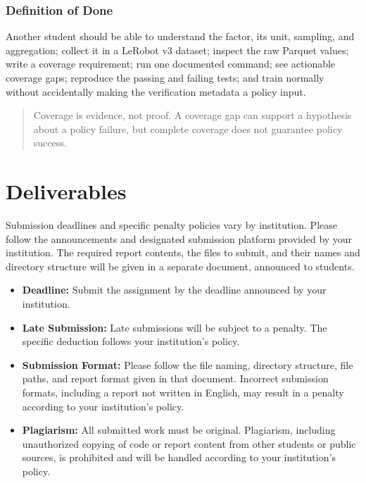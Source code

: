 \documentclass[11pt]{article}
\begin{document}
\subsubsection{Definition of Done}

Another student should be able to understand the factor, its unit, sampling, and aggregation; collect it in a
LeRobot v3 dataset; inspect the raw Parquet values; write a coverage requirement; run one documented command; see
actionable coverage gaps; reproduce the passing and failing tests; and train normally without accidentally making
the verification metadata a policy input.

\begin{quote}
Coverage is evidence, not proof. A coverage gap can support a hypothesis about a policy failure, but complete
coverage does not guarantee policy success.
\end{quote}


\section{Deliverables}

Submission deadlines and specific penalty policies vary by institution. Please follow the announcements and designated submission platform provided by your institution. The required report contents, the files to submit, and their names and directory structure will be given in a separate document, announced to students.

\begin{itemize}
    \item \textbf{Deadline: }
    Submit the assignment by the deadline announced by your institution.

    \item \textbf{Late Submission: }
    Late submissions will be subject to a penalty. The specific deduction follows your institution's policy.

    \item \textbf{Submission Format: }
    Please follow the file naming, directory structure, file paths, and report format given in that document. Incorrect submission formats, including a report not written in English, may result in a penalty according to your institution's
    policy. %

    \item \textbf{Plagiarism: }
    All submitted work must be original. Plagiarism, including unauthorized copying of code or report content from other students or public sources, is prohibited and will be handled according to your institution's policy.
\end{itemize}
\end{document}
